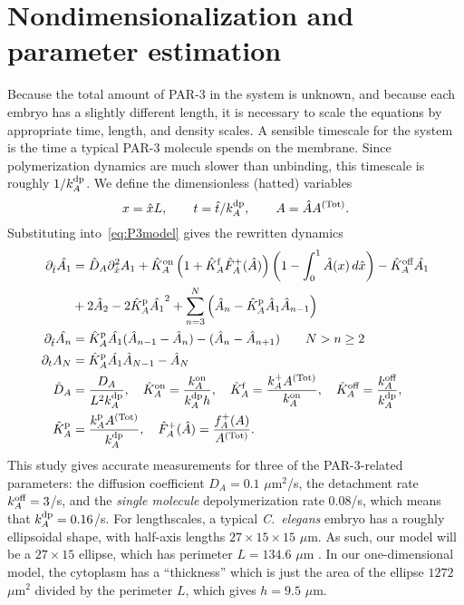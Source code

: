 \documentclass[11pt]{article}
\newcommand{\6}[1]{#1_{\text{6}}}
\newcommand{\3}[1]{#1_{\text{3}}}
\newcommand{\Tot}[1]{#1^\text{(Tot)}}
\newcommand{\A}[1]{#1_A}
\begin{document}
\section{Nondimensionalization and parameter estimation}
Because the total amount of PAR-3 in the system is unknown, and because each embryo has a slightly different length, it is necessary to scale the equations by appropriate time, length, and density scales. 
A sensible timescale for the system is the time a typical PAR-3 molecule spends on the membrane. Since polymerization dynamics are much slower than unbinding, this timescale is roughly $1/\A{\kdp}$. We define the dimensionless (hatted) variables $$x = \hat{x} L,\qquad t= \hat{t}/\A{\kdp},\qquad A= \hat{A}\Tot{A}.$$
Substituting into\ \eqref{eq:P3model} gives the rewritten dynamics \cite[Eq.~14]{lang2022oligomerization}
\begin{subequations}
\label{eq:PAR3gen}
\begin{align}
\nonumber
\Dthat \hat{\MA} & = \DhatA \Dxhat^2 \MA +\KhatonA \left(1+\KhatfA \hat F_A^+(\hat A) \right)\left(1 - \int_0^1 \hat A(x) \, d\hat{x} \right)- \KhatoffA \hat{\MA} \\ 
\label{eq:Amono} &+ 2 \hat{A}_2-2\KhatpA \hat{\MA}^2+\sum_{n=3}^N \left(\hat A_n-\KhatpA \hat A_1 \hat A_{n-1}\right)  \\
\label{eq:Apoly}
\Dthat \hat{\PA} & =\KhatpA \hat{\MA} (\hat A_{n-1}-\hat A_n) - (\hat A_n-\hat A_{n+1})  \qquad N > n \geq 2 \\ 
\Dt A_N & =\KhatpA\hat \MA \hat A_{N-1}- \hat A_N \\ 
\label{eq:paramsND}
\DhatA &=\frac{\A{D}}{L^2 \A{\kdp}}, \quad \KhatonA=\frac{\A{\kon}}{\A{\kdp} h }, \quad \KhatfA = \frac{\A{\kf}\Tot{A}}{\A{\kon}}, \quad  \KhatoffA = \frac{\koff_A}{\A{\kdp}}, \\ \nonumber \KhatpA &= \frac{\A{\kp} \Tot{A}}{\A{\kdp}},\quad \hat F_A^+(\hat A) =\frac{\A{f}^+(A)}{\Tot{A}}.
\end{align}
\end{subequations}
This study gives accurate measurements for three of the PAR-3-related parameters: the diffusion coefficient $D_A=0.1$ $\mu$m$^2$/s, the detachment rate $k^\text{off}_{A}=3$/s, and the \emph{single molecule} depolymerization rate $0.08$/s, which means that $k^\text{dp}_A=0.16$/s. For lengthscales, a typical \emph{C.\ elegans} embryo has a roughly ellipsoidal shape, with half-axis lengths $27 \times 15 \times 15$ $\mu$m. As such, our model will be a $27 \times 15$ ellipse, which has perimeter $L=134.6$ $\mu$m \cite{goehring2011polarization}. In our one-dimensional model, the cytoplasm has a ``thickness'' which is just the area of the ellipse $1272$ $\mu$m$^2$ divided by the perimeter $L$, which gives $h=9.5$ $\mu$m.
\end{document}
